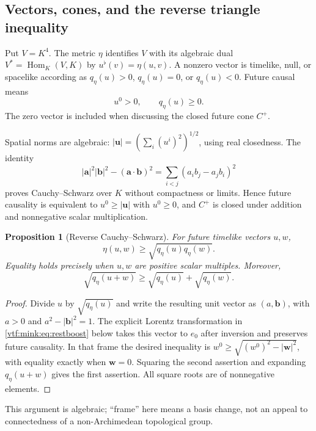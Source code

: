 \documentclass[11pt,letterpaper]{article}
\newtheorem{proposition}[theorem]{Proposition}
\theoremstyle{definition}
\theoremstyle{remark}
\newcommand{\Hom}{\operatorname{Hom}}\newcommand{\diag}{\operatorname{diag}}
\newcommand{\inner}[2]{\eta(#1,#2)}
\begin{document}
\subsection{Vectors, cones, and the reverse triangle inequality}
Put $V=K^4$. The metric $\eta$ identifies $V$ with its algebraic dual $V^*=\Hom_K(V,K)$ by $u^\flat(v)=\inner{u}{v}$. A nonzero vector is timelike, null, or spacelike according as $q_\eta(u)>0$, $q_\eta(u)=0$, or $q_\eta(u)<0$. Future causal means
\begin{equation}
 u^0>0,\qquad q_\eta(u)\ge0.
\end{equation}
The zero vector is included when discussing the closed future cone $C^+$.

Spatial norms are algebraic:
$|\mathbf u|=(\sum_i(u^i)^2)^{1/2}$, using real closedness. The identity
\begin{equation}
 |\mathbf a|^2|\mathbf b|^2-(\mathbf a\cdot\mathbf b)^2
 =\sum_{i<j}(a_i b_j-a_j b_i)^2
\end{equation}
proves Cauchy--Schwarz over $K$ without compactness or limits. Hence future causality is equivalent to $u^0\ge|\mathbf u|$ with $u^0\ge0$, and $C^+$ is closed under addition and nonnegative scalar multiplication.

\begin{proposition}[Reverse Cauchy--Schwarz]\label{vtf:mink:thm:reverse}
For future timelike vectors $u,w$,
\begin{equation}
 \inner{u}{w}\ge\sqrt{q_\eta(u)q_\eta(w)}.
\end{equation}
Equality holds precisely when $u,w$ are positive scalar multiples. Moreover,
\begin{equation}
 \sqrt{q_\eta(u+w)}\ge\sqrt{q_\eta(u)}+\sqrt{q_\eta(w)}.
\end{equation}
\end{proposition}
\begin{proof}
Divide $u$ by $\sqrt{q_\eta(u)}$ and write the resulting unit vector as $(a,\mathbf b)$, with $a>0$ and $a^2-|\mathbf b|^2=1$. The explicit Lorentz transformation in \cref{vtf:mink:eq:restboost} below takes this vector to $e_0$ after inversion and preserves future causality. In that frame the desired inequality is $w^0\ge\sqrt{(w^0)^2-|\mathbf w|^2}$, with equality exactly when $\mathbf w=0$. Squaring the second assertion and expanding $q_\eta(u+w)$ gives the first assertion. All square roots are of nonnegative elements.
\end{proof}
This argument is algebraic; ``frame'' here means a basis change, not an appeal to connectedness of a non-Archimedean topological group.
\end{document}

